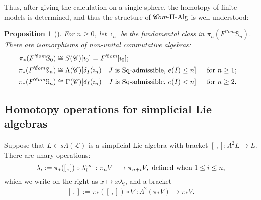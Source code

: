 \documentclass[11pt]{amsart}
\theoremstyle{plain}
\newtheorem{prop}[thm]{Proposition}
\theoremstyle{definition}
\renewcommand{\to}{\longrightarrow}
\newcommand{\scrL}{\mathscr{L}}
\newcommand{\scrC}{\mathscr{C}}
\theoremstyle{plain}
\newcommand{\LieOperad}{{\scrL}}
\newcommand{\CommOperad}{{\scrC}}
\newcommand{\PiAlg}{\textup{-$\Pi$-Alg}}
\newcommand{\Sq}{\mathrm{Sq}}
\newcommand{\algs}{\scrC\!\textit{om}}
\begin{document}
\begin{Constructing homotopy and cohomotopy operations}
\noindent Thus, after giving the calculation on a single sphere, the homotopy of finite models is determined, and thus the structure of $\algs\PiAlg$ is well understood:
\begin{prop}[{\cite[Proposition 2.7]{MR1089001}}]
\noindent For $n\geq0$, let $\imath_n$ be the fundamental class in $\pi_n(F^{\algs}\mathbb{S}_n)$. There  are isomorphisms of non-unital commutative algebras:
\begin{alignat*}{2}
\pi_*(F^{\algs}\mathbb{S}_0)
&\cong
S(\CommOperad)[\imath_0]=F^{\algs}[\imath_0];%
\\
\pi_*(F^{\algs}\mathbb{S}_n)
&\cong
\makebox[\widthof{$\Lambda$}][c]{$\Lambda$}(\CommOperad)[\delta_I(\imath_n)\ |\ \textup{$J$ is $\Sq$-admissible, $e(I)\leq n$}]%
&\ \ &\makebox[\widthof{for $n\geq1$}][c]{for $n\geq1$;}\\
\pi_*(F^{\algs}\mathbb{S}_n)
&\cong
\makebox[\widthof{$\Lambda$}][c]{$\Gamma$}(\CommOperad)[\delta_I(\imath_n)\ |\ \textup{$J$ is $\Sq$-admissible, $e(I)< n$}]%
&\ \ &\makebox[\widthof{for $n\geq1$}][c]{for $n\geq2$.}%
\end{alignat*}
\end{prop}

\subsection{Homotopy operations for simplicial Lie algebras}\label{Homotopy operations for simplicial Lie algebras}
Suppose that $L\in s \Lambda(\LieOperad)$ is a simplicial Lie algebra with bracket $[\,,]:\Lambda^2L\to L$. There are unary operations:
\[\lambda_i:=\pi_*([\,,])\circ\lambda_i^\textup{ext}:\pi_nV\to \pi_{n+i}V,\textup{ defined when }1\leq i\leq n,\]
which we write on the right as $x\mapsto x\lambda_i$, and a bracket
\[[\,,]:=\pi_*([\,,])\circ\widetilde{\nabla}:\Lambda^2(\pi_*V)\to \pi_{*}V.\]


\end{Constructing homotopy and cohomotopy operations}
\end{document}
